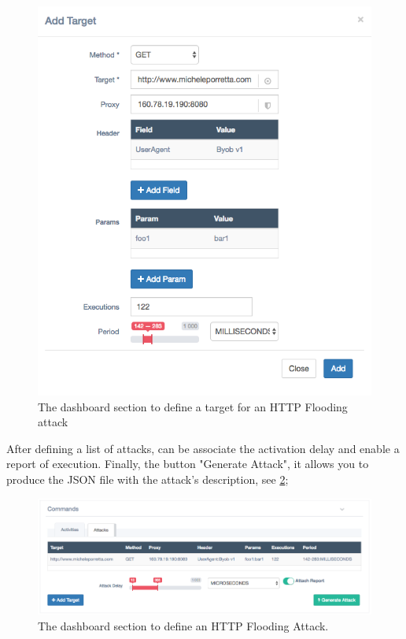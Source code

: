 \begin{figure}[tp]
  \centering
  \includegraphics[scale=0.45]{./fig/targetWUI.png}
  \caption{The dashboard section to define a target for an HTTP Flooding attack}
    \label{fig:target-dashboard}
\end{figure}

After defining a list of attacks, can be associate the activation delay and enable a report of execution. Finally, the button "Generate Attack", it allows you to produce the JSON file with the attack's description, see \ref{fig:attack-dashboard};

\begin{figure}[tp]
  \centering
  \includegraphics[scale=0.45]{./fig/attackWUI.png}
  \caption{The dashboard section to define an HTTP Flooding Attack.}
    \label{fig:attack-dashboard}
\end{figure}
